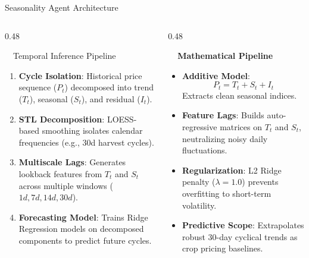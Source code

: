 \documentclass{beamer}
\begin{document}
\begin{frame}{Seasonality Agent Architecture}
\vspace{-0.2cm}

\begin{columns}[T]
    \begin{column}{0.48\textwidth}
        \begin{infocard}{~~Temporal Inference Pipeline}
            \fontsize{6.8pt}{8.5pt}\selectfont
            \begin{enumerate}\setlength\itemsep{3pt}\setlength\parskip{0pt}
                \item[\textbf{1.}] \textbf{Cycle Isolation}: Historical price sequence ($P_t$) decomposed into trend ($T_t$), seasonal ($S_t$), and residual ($I_t$).
                \item[\textbf{2.}] \textbf{STL Decomposition}: LOESS-based smoothing isolates calendar frequencies (e.g., 30d harvest cycles).
                \item[\textbf{3.}] \textbf{Multiscale Lags}: Generates lookback features from $T_t$ and $S_t$ across multiple windows ($1d, 7d, 14d, 30d$).
                \item[\textbf{4.}] \textbf{Forecasting Model}: Trains Ridge Regression models on decomposed components to predict future cycles.
            \end{enumerate}
        \end{infocard}
    \end{column}
    
    \begin{column}{0.48\textwidth}
        \begin{smallcard}[0.98\textwidth, top=3pt, bottom=3pt, left=4pt, right=4pt, boxsep=0.5pt]
            \centering \textbf{\textcolor{primaryDark}{\small {}~~Mathematical Pipeline}}
            \vspace{0.05cm}
            \fontsize{6.8pt}{8.2pt}\selectfont
            \begin{itemize}\setlength\itemsep{3.5pt}\setlength\parskip{0pt}
                \item \textbf{Additive Model}: 
                \[ P_t = T_t + S_t + I_t \]
                Extracts clean seasonal indices.
                \item \textbf{Feature Lags}: Builds auto-regressive matrices on $T_t$ and $S_t$, neutralizing noisy daily fluctuations.
                \item \textbf{Regularization}: L2 Ridge penalty ($\lambda = 1.0$) prevents overfitting to short-term volatility.
                \item \textbf{Predictive Scope}: Extrapolates robust 30-day cyclical trends as crop pricing baselines.
            \end{itemize}
        \end{smallcard}
    \end{column}
\end{columns}


\end{frame}
\end{document}
